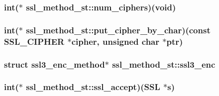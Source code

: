 \hypertarget{structssl__method__st_ac94952d064203e9f6953b0cda68c93b7}{
\subsubsection[{num\-\_\-ciphers}]{\setlength{\rightskip}{0pt plus 5cm}int($\ast$ ssl\-\_\-method\-\_\-st\-::num\-\_\-ciphers)(void)}}\label{structssl__method__st_ac94952d064203e9f6953b0cda68c93b7}
\hypertarget{structssl__method__st_adbb1a7591225577ffe6996267c5e2a9f}{
\subsubsection[{put\-\_\-cipher\-\_\-by\-\_\-char}]{\setlength{\rightskip}{0pt plus 5cm}int($\ast$ ssl\-\_\-method\-\_\-st\-::put\-\_\-cipher\-\_\-by\-\_\-char)(const {\bf S\-S\-L\-\_\-\-C\-I\-P\-H\-E\-R} $\ast$cipher, unsigned char $\ast$ptr)}}\label{structssl__method__st_adbb1a7591225577ffe6996267c5e2a9f}
\hypertarget{structssl__method__st_aa9b5c4c60c391bc6771bd035aa10ce0a}{
\subsubsection[{ssl3\-\_\-enc}]{\setlength{\rightskip}{0pt plus 5cm}struct {\bf ssl3\-\_\-enc\-\_\-method}$\ast$ ssl\-\_\-method\-\_\-st\-::ssl3\-\_\-enc}}\label{structssl__method__st_aa9b5c4c60c391bc6771bd035aa10ce0a}
\hypertarget{structssl__method__st_a7252a63269f4108a1359e099bf24b93c}{
\subsubsection[{ssl\-\_\-accept}]{\setlength{\rightskip}{0pt plus 5cm}int($\ast$ ssl\-\_\-method\-\_\-st\-::ssl\-\_\-accept)(S\-S\-L $\ast$s)}}\label{structssl__method__st_a7252a63269f4108a1359e099bf24b93c}
